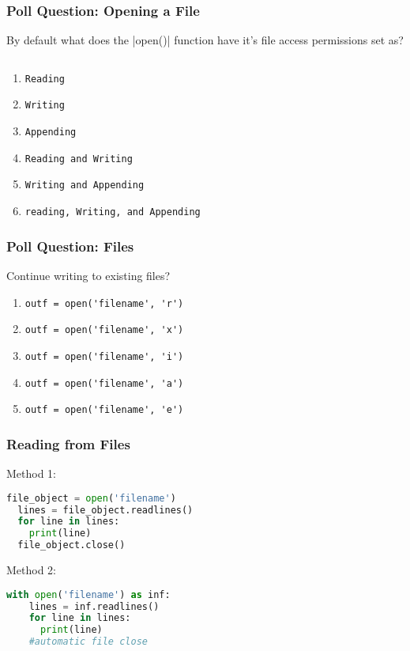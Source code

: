 \documentclass{beamer}
\begin{document}
%
%
\begin{frame}[fragile]
  \frametitle{Poll Question: Opening a File}
  By default what does the \listinline|open()| function have it's file access permissions set as?
  \begin{lstlisting}[language=Python, autogobble]
  \end{lstlisting}
  \vfill
  \begin{enumerate}[A]
    \item \lstinline|Reading|
    \item \lstinline|Writing|
    \item \lstinline|Appending|
    \item \lstinline|Reading and Writing|
    \item \lstinline|Writing and Appending|
    \item \lstinline|reading, Writing, and Appending|
  \end{enumerate}
\end{frame}

%
%
\begin{frame}[fragile]
  \frametitle{Poll Question: Files}
  Continue writing to existing files?
  \vfill
  \begin{enumerate}[A]
    \item \lstinline|outf = open('filename', 'r')|
    \item \lstinline|outf = open('filename', 'x')|
    \item \lstinline|outf = open('filename', 'i')|
    \item \lstinline|outf = open('filename', 'a')|
    \item \lstinline|outf = open('filename', 'e')|
  \end{enumerate}
\end{frame}

%
%
\begin{frame}[fragile]
  \frametitle{Reading from Files}
  Method 1:
  \begin{lstlisting}[language=Python, autogobble]
  file_object = open('filename')
  lines = file_object.readlines()
  for line in lines:
    print(line)
  file_object.close()
  \end{lstlisting}
  \vfill
  Method 2:
  \begin{lstlisting}[language=Python, autogobble]
  with open('filename') as inf:
    lines = inf.readlines()
    for line in lines:
      print(line)
    #automatic file close
  \end{lstlisting}
\end{frame}
\end{document}
